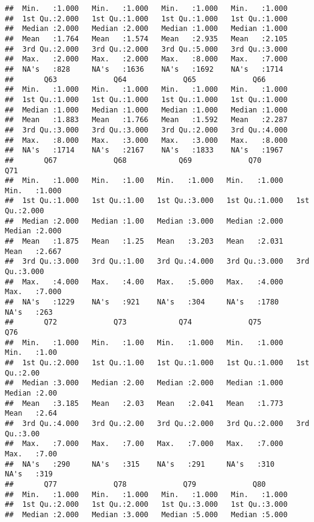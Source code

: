 \documentclass[
]{article}
\begin{document}
\begin{verbatim}
##  Min.   :1.000   Min.   :1.000   Min.   :1.000   Min.   :1.000  
##  1st Qu.:2.000   1st Qu.:1.000   1st Qu.:1.000   1st Qu.:1.000  
##  Median :2.000   Median :2.000   Median :1.000   Median :1.000  
##  Mean   :1.764   Mean   :1.574   Mean   :2.935   Mean   :2.105  
##  3rd Qu.:2.000   3rd Qu.:2.000   3rd Qu.:5.000   3rd Qu.:3.000  
##  Max.   :2.000   Max.   :2.000   Max.   :8.000   Max.   :7.000  
##  NA's   :828     NA's   :1636    NA's   :1692    NA's   :1714   
##       Q63             Q64             Q65             Q66       
##  Min.   :1.000   Min.   :1.000   Min.   :1.000   Min.   :1.000  
##  1st Qu.:1.000   1st Qu.:1.000   1st Qu.:1.000   1st Qu.:1.000  
##  Median :1.000   Median :1.000   Median :1.000   Median :1.000  
##  Mean   :1.883   Mean   :1.766   Mean   :1.592   Mean   :2.287  
##  3rd Qu.:3.000   3rd Qu.:3.000   3rd Qu.:2.000   3rd Qu.:4.000  
##  Max.   :8.000   Max.   :3.000   Max.   :3.000   Max.   :8.000  
##  NA's   :1714    NA's   :2167    NA's   :1833    NA's   :1967   
##       Q67             Q68            Q69             Q70             Q71       
##  Min.   :1.000   Min.   :1.00   Min.   :1.000   Min.   :1.000   Min.   :1.000  
##  1st Qu.:1.000   1st Qu.:1.00   1st Qu.:3.000   1st Qu.:1.000   1st Qu.:2.000  
##  Median :2.000   Median :1.00   Median :3.000   Median :2.000   Median :2.000  
##  Mean   :1.875   Mean   :1.25   Mean   :3.203   Mean   :2.031   Mean   :2.667  
##  3rd Qu.:3.000   3rd Qu.:1.00   3rd Qu.:4.000   3rd Qu.:3.000   3rd Qu.:3.000  
##  Max.   :4.000   Max.   :4.00   Max.   :5.000   Max.   :4.000   Max.   :7.000  
##  NA's   :1229    NA's   :921    NA's   :304     NA's   :1780    NA's   :263    
##       Q72             Q73            Q74             Q75             Q76      
##  Min.   :1.000   Min.   :1.00   Min.   :1.000   Min.   :1.000   Min.   :1.00  
##  1st Qu.:2.000   1st Qu.:1.00   1st Qu.:1.000   1st Qu.:1.000   1st Qu.:2.00  
##  Median :3.000   Median :2.00   Median :2.000   Median :1.000   Median :2.00  
##  Mean   :3.185   Mean   :2.03   Mean   :2.041   Mean   :1.773   Mean   :2.64  
##  3rd Qu.:4.000   3rd Qu.:2.00   3rd Qu.:2.000   3rd Qu.:2.000   3rd Qu.:3.00  
##  Max.   :7.000   Max.   :7.00   Max.   :7.000   Max.   :7.000   Max.   :7.00  
##  NA's   :290     NA's   :315    NA's   :291     NA's   :310     NA's   :319   
##       Q77             Q78             Q79             Q80       
##  Min.   :1.000   Min.   :1.000   Min.   :1.000   Min.   :1.000  
##  1st Qu.:2.000   1st Qu.:2.000   1st Qu.:3.000   1st Qu.:3.000  
##  Median :2.000   Median :3.000   Median :5.000   Median :5.000  

\end{verbatim}
\end{document}

